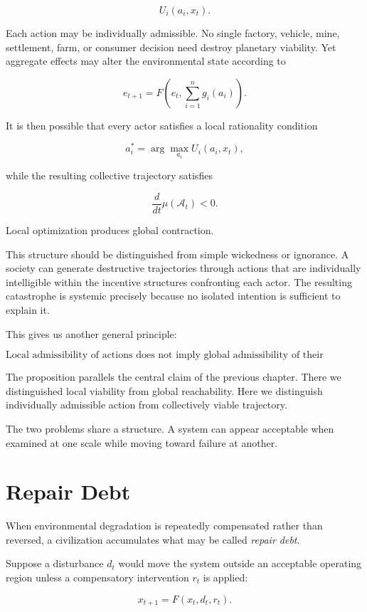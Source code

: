 \documentclass[11pt,oneside]{book}
\theoremstyle{definition}
\theoremstyle{remark}
\newcommand{\A}{\mathcal{A}}
\begin{document}
\[
U_i(a_i,x_t).
\]

Each action may be individually admissible. No single factory, vehicle, mine, settlement, farm, or consumer decision need destroy planetary viability. Yet aggregate effects may alter the environmental state according to

\[
e_{t+1}
=
F\!\left(
e_t,
\sum_{i=1}^{n}g_i(a_i)
\right).
\]

It is then possible that every actor satisfies a local rationality condition

\[
a_i^\ast
=
\arg\max_{a_i} U_i(a_i,x_t),
\]

while the resulting collective trajectory satisfies

\[
\frac{d}{dt}\mu(\A_t)<0.
\]

Local optimization produces global contraction.

This structure should be distinguished from simple wickedness or ignorance. A society can generate destructive trajectories through actions that are individually intelligible within the incentive structures confronting each actor. The resulting catastrophe is systemic precisely because no isolated intention is sufficient to explain it.

This gives us another general principle:

\[
\boxed{
\text{Local admissibility of actions does not imply global admissibility of their composition.}
}
\]

The proposition parallels the central claim of the previous chapter. There we distinguished local viability from global reachability. Here we distinguish individually admissible action from collectively viable trajectory.

The two problems share a structure. A system can appear acceptable when examined at one scale while moving toward failure at another.

\section{Repair Debt}

When environmental degradation is repeatedly compensated rather than reversed, a civilization accumulates what may be called \emph{repair debt}.

Suppose a disturbance \(d_t\) would move the system outside an acceptable operating region unless a compensatory intervention \(r_t\) is applied:

\[
x_{t+1}
=
F(x_t,d_t,r_t).
\]
\end{document}
